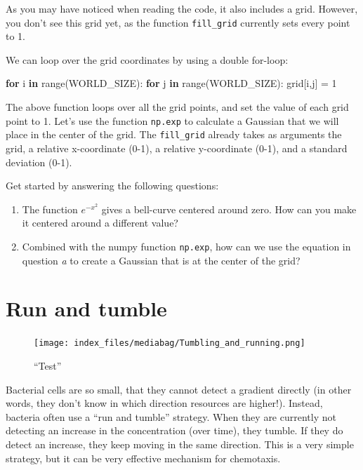 \documentclass[
  letterpaper,
  DIV=11,
  numbers=noendperiod]{scrreprt}
\newenvironment{Shaded}{\begin{snugshade}}{\end{snugshade}}
\newcommand{\BuiltInTok}[1]{\textcolor[rgb]{0.00,0.23,0.31}{#1}}
\newcommand{\ControlFlowTok}[1]{\textcolor[rgb]{0.00,0.23,0.31}{\textbf{#1}}}
\newcommand{\DecValTok}[1]{\textcolor[rgb]{0.68,0.00,0.00}{#1}}
\newcommand{\KeywordTok}[1]{\textcolor[rgb]{0.00,0.23,0.31}{\textbf{#1}}}
\newcommand{\NormalTok}[1]{\textcolor[rgb]{0.00,0.23,0.31}{#1}}
\newcommand{\OperatorTok}[1]{\textcolor[rgb]{0.37,0.37,0.37}{#1}}
\providecommand{\tightlist}{%
  \setlength{\itemsep}{0pt}\setlength{\parskip}{0pt}}\usepackage{longtable,booktabs,array}
\theoremstyle{definition}
\theoremstyle{remark}
\begin{document}
As you may have noticed when reading the code, it also includes a grid.
However, you don't see this grid yet, as the function
\texttt{fill\_grid} currently sets every point to 1.

We can loop over the grid coordinates by using a double for-loop:

\begin{Shaded}
\begin{Highlighting}[]
\ControlFlowTok{for}\NormalTok{ i }\KeywordTok{in} \BuiltInTok{range}\NormalTok{(WORLD\_SIZE):}
  \ControlFlowTok{for}\NormalTok{ j }\KeywordTok{in} \BuiltInTok{range}\NormalTok{(WORLD\_SIZE):}
\NormalTok{    grid[i,j] }\OperatorTok{=} \DecValTok{1}
\end{Highlighting}
\end{Shaded}

The above function loops over all the grid points, and set the value of
each grid point to 1. Let's use the function \texttt{np.exp} to
calculate a Gaussian that we will place in the center of the grid. The
\texttt{fill\_grid} already takes as arguments the grid, a relative
x-coordinate (0-1), a relative y-coordinate (0-1), and a standard
deviation (0-1).

Get started by answering the following questions:

\begin{enumerate}
\def\labelenumi{\alph{enumi}.}
\tightlist
\item
  The function \(e^{-x^2}\) gives a bell-curve centered around zero. How
  can you make it centered around a different value?
\item
  Combined with the numpy function \texttt{np.exp}, how can we use the
  equation in question \emph{a} to create a Gaussian that is at the
  center of the grid?
\end{enumerate}

\section{Run and tumble}\label{sec-runandtumble}

\begin{figure}[H]

{\centering \texttt{[image: index\_files/mediabag/Tumbling\_and\_running.png]}

}

\caption{``Test''}

\end{figure}%

Bacterial cells are so small, that they cannot detect a gradient
directly (in other words, they don't know in which direction resources
are higher!). Instead, bacteria often use a ``run and tumble'' strategy.
When they are currently not detecting an increase in the concentration
(over time), they tumble. If they do detect an increase, they keep
moving in the same direction. This is a very simple strategy, but it can
be very effective mechanism for chemotaxis.
\end{document}
